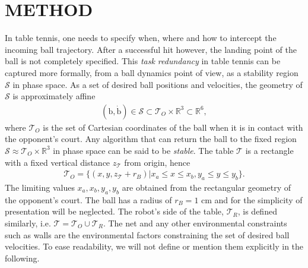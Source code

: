 \documentclass[letterpaper, 10 pt, conference]{ieeeconf}
\newcommand{\boldvec}[1]{\boldsymbol{\mathrm{#1}}}
\let\vec\boldvec
\newcommand{\ball}{\vec{b}} %
\newcommand{\ballRadius}{r_B}
\newcommand{\stabilityRegion}{\mathcal{S}} %
\newcommand{\courtOpponent}{\mathcal{T}_{O}} %
\newcommand{\courtRobot}{\mathcal{T}_{R}} %
\newcommand{\court}{\mathcal{T}} %
\begin{document}

\section{METHOD}\label{method}

In table tennis, one needs to specify when, where and how to intercept the incoming ball trajectory. After a successful hit however, the landing point of the ball is not completely specified. This \emph{task redundancy} in table tennis can be captured more formally, from a ball dynamics point of view, as a stability region $\stabilityRegion$ in phase space. As a set of desired ball positions and velocities, the geometry of $\stabilityRegion$ is approximately affine
%
\begin{align}
(\ball,\dot{\ball}) \in \stabilityRegion \subset \courtOpponent \times \mathbb{R}^{3} \subset \mathbb{R}^{6},
\label{stabilityRegion}
\end{align}
%
\noindent where $\courtOpponent$ is the set of Cartesian coordinates of the ball when it is in contact with the opponent's court. Any algorithm that can return the ball to the fixed region $\stabilityRegion \approx \courtOpponent \times \mathbb{R}^3$ in phase space can be said to be \emph{stable}. The table $\court$ is a rectangle with a fixed vertical distance $z_{\court}$ from origin, hence
%
\begin{align}
\courtOpponent = \{(x,y,z_{\court} + \ballRadius)|x_a \leq x \leq x_b, y_a \leq y \leq y_b\}.
\label{courtOpponent}
\end{align}
%
The limiting values $x_{a},x_{b},y_{a},y_{b}$ are obtained from the rectangular geometry of the opponent's court. The ball has a radius of $\ballRadius = 1$ cm and for the simplicity of presentation will be neglected. The robot's side of the table, $\courtRobot$, is defined similarly, i.e. $\court = \courtOpponent \cup \courtRobot$. The net and any other environmental constraints such as walls are the environmental factors constraining the set of desired ball velocities. To ease readability, we will not define or mention them explicitly in the following. 

%
\end{document}
